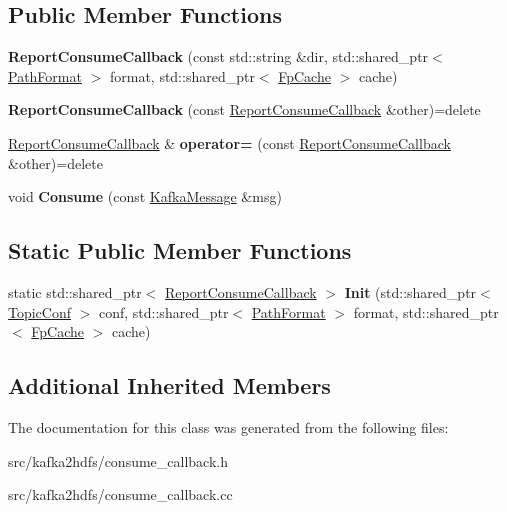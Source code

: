 \subsection*{Public Member Functions}
\begin{DoxyCompactItemize}
\item 
{\bfseries Report\+Consume\+Callback} (const std\+::string \&dir, std\+::shared\+\_\+ptr$<$ \hyperlink{classlog2hdfs_1_1PathFormat}{Path\+Format} $>$ format, std\+::shared\+\_\+ptr$<$ \hyperlink{classlog2hdfs_1_1FpCache}{Fp\+Cache} $>$ cache)\hypertarget{classlog2hdfs_1_1ReportConsumeCallback_ab97bc426819b659bdaaae4fddd6e5249}{}\label{classlog2hdfs_1_1ReportConsumeCallback_ab97bc426819b659bdaaae4fddd6e5249}

\item 
{\bfseries Report\+Consume\+Callback} (const \hyperlink{classlog2hdfs_1_1ReportConsumeCallback}{Report\+Consume\+Callback} \&other)=delete\hypertarget{classlog2hdfs_1_1ReportConsumeCallback_a7edcd4aa004d2a66209cfbfeb83de5e1}{}\label{classlog2hdfs_1_1ReportConsumeCallback_a7edcd4aa004d2a66209cfbfeb83de5e1}

\item 
\hyperlink{classlog2hdfs_1_1ReportConsumeCallback}{Report\+Consume\+Callback} \& {\bfseries operator=} (const \hyperlink{classlog2hdfs_1_1ReportConsumeCallback}{Report\+Consume\+Callback} \&other)=delete\hypertarget{classlog2hdfs_1_1ReportConsumeCallback_a0d11839ebab05d5e58a525226da584f6}{}\label{classlog2hdfs_1_1ReportConsumeCallback_a0d11839ebab05d5e58a525226da584f6}

\item 
void {\bfseries Consume} (const \hyperlink{classlog2hdfs_1_1KafkaMessage}{Kafka\+Message} \&msg)\hypertarget{classlog2hdfs_1_1ReportConsumeCallback_a926f5f60ba12cbfb3b80f1b78c9969ce}{}\label{classlog2hdfs_1_1ReportConsumeCallback_a926f5f60ba12cbfb3b80f1b78c9969ce}

\end{DoxyCompactItemize}
\subsection*{Static Public Member Functions}
\begin{DoxyCompactItemize}
\item 
static std\+::shared\+\_\+ptr$<$ \hyperlink{classlog2hdfs_1_1ReportConsumeCallback}{Report\+Consume\+Callback} $>$ {\bfseries Init} (std\+::shared\+\_\+ptr$<$ \hyperlink{classlog2hdfs_1_1TopicConf}{Topic\+Conf} $>$ conf, std\+::shared\+\_\+ptr$<$ \hyperlink{classlog2hdfs_1_1PathFormat}{Path\+Format} $>$ format, std\+::shared\+\_\+ptr$<$ \hyperlink{classlog2hdfs_1_1FpCache}{Fp\+Cache} $>$ cache)\hypertarget{classlog2hdfs_1_1ReportConsumeCallback_a95ecf78594436e916cadf6077823967f}{}\label{classlog2hdfs_1_1ReportConsumeCallback_a95ecf78594436e916cadf6077823967f}

\end{DoxyCompactItemize}
\subsection*{Additional Inherited Members}


The documentation for this class was generated from the following files\+:\begin{DoxyCompactItemize}
\item 
src/kafka2hdfs/consume\+\_\+callback.\+h\item 
src/kafka2hdfs/consume\+\_\+callback.\+cc\end{DoxyCompactItemize}

